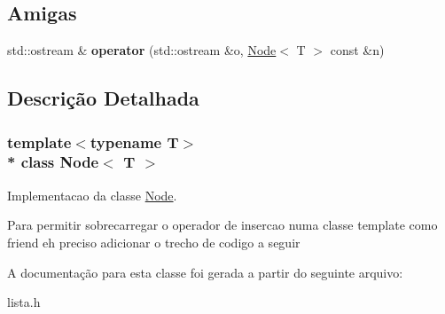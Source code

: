 \subsection*{Amigas}
\begin{DoxyCompactItemize}
\item 
std\+::ostream \& {\bfseries operator} (std\+::ostream \&o, \hyperlink{classNode}{Node}$<$ T $>$ const \&n)\hypertarget{classNode_af4dd23ddeacb247749f1f4fc7e22d96f}{}\label{classNode_af4dd23ddeacb247749f1f4fc7e22d96f}

\end{DoxyCompactItemize}


\subsection{Descrição Detalhada}
\subsubsection*{template$<$typename T$>$\\*
class Node$<$ T $>$}

Implementacao da classe \hyperlink{classNode}{Node}. 

Para permitir sobrecarregar o operador de insercao numa classe template como friend eh preciso adicionar o trecho de codigo a seguir 

A documentação para esta classe foi gerada a partir do seguinte arquivo\+:\begin{DoxyCompactItemize}
\item 
lista.\+h\end{DoxyCompactItemize}
